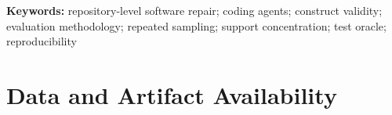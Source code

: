 \documentclass[11pt,a4paper]{article}
\title{\PaperTitle}
\author{\PaperAuthorBlock}
\date{\small DOI: \href{https://doi.org/\PaperDOI}{\PaperDOI}}
\newenvironment{keywords}{\par\smallskip\noindent\textbf{Keywords: }}{\par}
\begin{document}
\maketitle

\begin{abstract}

\end{abstract}

\begin{keywords}
repository-level software repair; coding agents; construct validity; evaluation methodology; repeated sampling; support concentration; test oracle; reproducibility
\end{keywords}










\section*{Data and Artifact Availability}





\appendix




\end{document}
